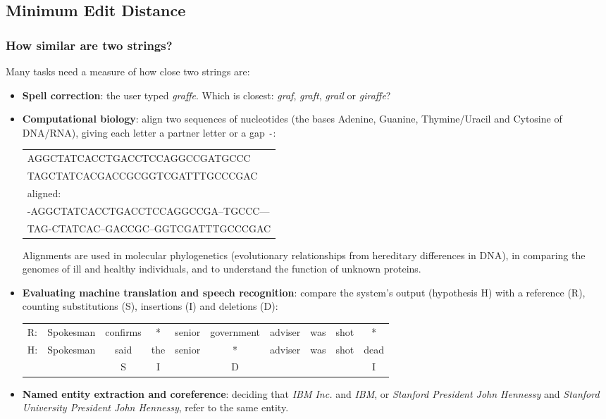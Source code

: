 \subsection{Minimum Edit Distance}
\label{sec:minimum-edit-distance}

\subsubsection{How similar are two strings?}

Many tasks need a measure of how close two strings are:
\begin{itemize}
  \item \textbf{Spell correction}: the user typed \emph{graffe}. Which is closest:
        \emph{graf}, \emph{graft}, \emph{grail} or \emph{giraffe}?
  \item \textbf{Computational biology}: align two sequences of nucleotides (the bases
        Adenine, Guanine, Thymine/Uracil and Cytosine of DNA/RNA), giving each letter a
        partner letter or a gap \texttt{-}:
\begin{center}
\small\ttfamily
\begin{tabular}{@{}l@{}}
AGGCTATCACCTGACCTCCAGGCCGATGCCC\\
TAGCTATCACGACCGCGGTCGATTTGCCCGAC\\[3pt]
\textrm{\normalsize aligned:}\\
-AGGCTATCACCTGACCTCCAGGCCGA--TGCCC---\\
TAG-CTATCAC--GACCGC--GGTCGATTTGCCCGAC
\end{tabular}
\end{center}
        Alignments are used in molecular phylogenetics (evolutionary relationships from
        hereditary differences in DNA), in comparing the genomes of ill and healthy
        individuals, and to understand the function of unknown proteins.
  \item \textbf{Evaluating machine translation and speech recognition}: compare the
        system's output (hypothesis H) with a reference (R), counting substitutions (S),
        insertions (I) and deletions (D):
\begin{center}
\small
\begin{tabular}{@{}l *{9}{c}@{}}
R: & Spokesman & confirms & *   & senior & government & adviser & was & shot & *    \\
H: & Spokesman & said     & the & senior & *          & adviser & was & shot & dead \\
   &           & S        & I   &        & D          &         &     &      & I
\end{tabular}
\end{center}
  \item \textbf{Named entity extraction and coreference}: deciding that \emph{IBM Inc.}
        and \emph{IBM}, or \emph{Stanford President John Hennessy} and \emph{Stanford
        University President John Hennessy}, refer to the same entity.
\end{itemize}


